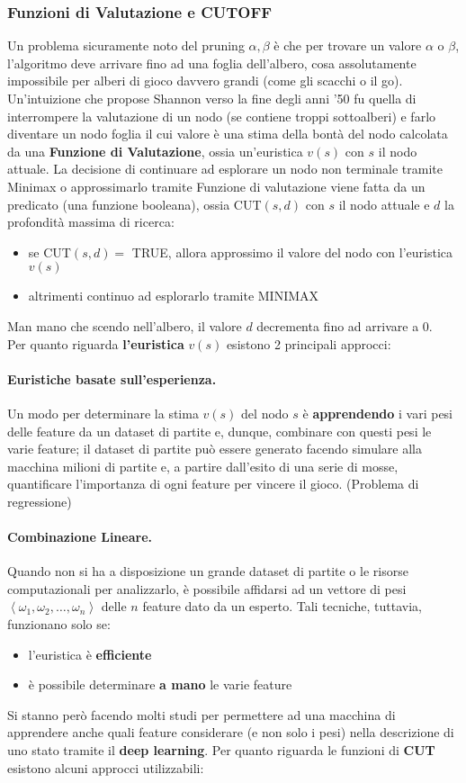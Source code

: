 \subsubsection{Funzioni di Valutazione e CUTOFF}
Un problema sicuramente noto del pruning $\alpha,\beta$ è che per trovare un valore $\alpha$ o $\beta$, l'algoritmo deve arrivare fino ad una foglia
dell'albero, cosa assolutamente impossibile per alberi di gioco davvero grandi (come gli scacchi o il go). Un'intuizione che propose Shannon
verso la fine degli anni '50 fu quella di interrompere la valutazione di un nodo (se contiene troppi sottoalberi) e farlo diventare un nodo foglia
il cui valore è una stima della bontà del nodo calcolata da una \textbf{Funzione di Valutazione}, ossia un'euristica $v(s)$ con $s$ il nodo attuale.
La decisione di continuare ad esplorare un nodo non terminale tramite Minimax o approssimarlo tramite Funzione di valutazione viene fatta da un predicato 
(una funzione booleana), ossia CUT$(s,d)$ con $s$ il nodo attuale e $d$ la profondità massima di ricerca:
\begin{itemize}
    \item se CUT$(s,d) = $ TRUE, allora approssimo il valore del nodo con l'euristica $v(s)$
    \item altrimenti continuo ad esplorarlo tramite MINIMAX
\end{itemize}
Man mano che scendo nell'albero, il valore $d$ decrementa fino ad arrivare a $0$.\\
Per quanto riguarda \textbf{l'euristica} $v(s)$ esistono 2 principali approcci:
\paragraph{Euristiche basate sull'esperienza.} 
Un modo per determinare la stima $v(s)$ del nodo $s$ è \textbf{apprendendo} i vari pesi delle feature da un dataset di partite
e, dunque, combinare con questi pesi le varie feature; il dataset di partite può essere generato facendo simulare 
alla macchina milioni di partite e, a partire dall'esito di una serie di mosse, quantificare l'importanza di ogni feature per vincere il gioco. (Problema di regressione)

\paragraph{Combinazione Lineare.}
Quando non si ha a disposizione un grande dataset di partite o le risorse computazionali per analizzarlo, è possibile affidarsi ad un vettore
di pesi $\left<\omega_1, \omega_2, \ldots, \omega_n\right>$ delle $n$ feature dato da un esperto.
Tali tecniche, tuttavia, funzionano solo se:
\begin{itemize}
    \item l'euristica è \textbf{efficiente}
    \item è possibile determinare \textbf{a mano} le varie feature
\end{itemize}
Si stanno però facendo molti studi per permettere ad una macchina di apprendere anche quali feature considerare (e non solo i pesi)
nella descrizione di uno stato tramite il \textbf{deep learning}.
Per quanto riguarda le funzioni di \textbf{CUT} esistono alcuni approcci utilizzabili:
